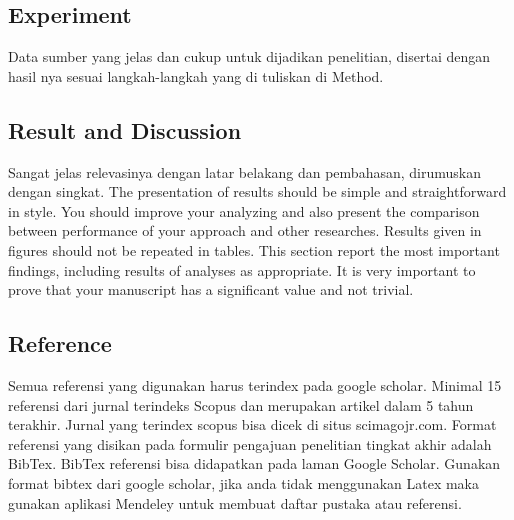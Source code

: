 \subsection{Experiment}
Data sumber yang jelas dan cukup untuk dijadikan penelitian, disertai dengan hasil nya sesuai langkah-langkah yang di tuliskan di Method.

\subsection{Result and Discussion}
Sangat jelas relevasinya dengan latar belakang dan pembahasan, dirumuskan dengan singkat. The presentation of results should be simple and straightforward in style. You should improve your analyzing and also present the comparison between performance of your approach and other researches. Results given in figures should not be repeated in tables. This section report the most important findings, including results of analyses as appropriate. It is very important to prove that your manuscript has a significant value and not trivial.

\subsection{Reference}
Semua  referensi  yang  digunakan  harus  terindex  pada  google  scholar.   Minimal  15 referensi dari jurnal terindeks Scopus dan merupakan artikel dalam 5 tahun terakhir. Jurnal yang terindex scopus bisa dicek di situs scimagojr.com.  Format referensi yang disikan  pada  formulir  pengajuan  penelitian  tingkat  akhir  adalah  BibTex.   BibTex referensi bisa didapatkan pada laman Google Scholar. Gunakan format bibtex dari google scholar, jika anda tidak menggunakan Latex maka gunakan aplikasi Mendeley untuk membuat daftar pustaka atau referensi.

